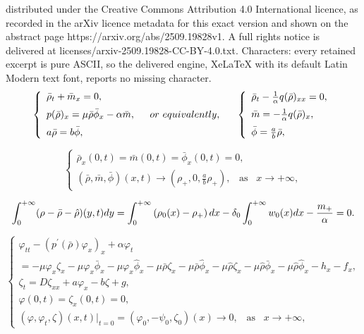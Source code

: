 \documentclass[10pt,a4paper]{amsart}
\begin{document}
distributed under the Creative Commons Attribution 4.0 International licence, as recorded in the arXiv licence metadata for this exact version and shown on the abstract page https://arxiv.org/abs/2509.19828v1. A full rights notice is delivered at licenses/arxiv-2509.19828-CC-BY-4.0.txt. Characters: every retained excerpt is pure ASCII, so the delivered engine, XeLaTeX with its default Latin Modern text font, reports no missing character.
	\begin{equation}\label{6}
		\left\{
		\begin{array}{lr}
			\bar\rho_t+\bar m_x=0,      \\[2mm]
			p(\bar\rho)_x=\mu\bar\rho\bar\phi_x-\alpha\bar m, \\[2mm]
			a\bar\rho=b\bar\phi,\\
		\end{array}
		\right.\;\;\;{\rm or \ equivalently,}\;\;\;\;\;\;
		\left\{
		\begin{array}{lr}
			\bar\rho_t-\frac{1}{\alpha}q(\bar\rho)_{xx}=0,     \\[2mm]
			\bar m=-\frac{1}{\alpha}q(\bar\rho)_x, \\[2mm]
			\bar\phi=\frac{a}{b}\bar\rho, \\
		\end{array}
		\right.
	\end{equation}

	\begin{equation}\label{7}
	\left\{
		\begin{array}{lr}
		\bar\rho_x(0,t)=\bar m(0,t)=\bar\phi_x(0,t)=0,\\[2mm]
		(\bar\rho,\bar m,\bar\phi)(x,t)\to\left(\rho_{+},0,\frac{a}{b}\rho_{+}\right),\;\;\;\mbox{as}\;\;\;x\to+\infty,
		\end{array}
		\right.
	\end{equation}

\begin{equation}\label{15}
\int_{0}^{+\infty}(\rho-\bar{\rho}-\hat{\rho})(y, t) {\rm d}y=\int_{0}^{+\infty}\left(\rho_{0}(x)-\rho_{+}\right) {\rm d} x-\delta_{0} \int_{0}^{+\infty} w_{0}(x) {\rm d} x-\frac{m_{+}}{\alpha}=0.
\end{equation}

	\begin{equation}\label{20}
		\left\{
		\begin{array}{lr}
			\varphi_{tt}-\left(p^{\prime}(\bar\rho)\varphi_x\right)_x	+\alpha \varphi_t\\[2mm]
			=-\mu \varphi_x\zeta_x-\mu \varphi_x\bar\phi_x-\mu \varphi_x\hat\phi_x-\mu\bar\rho\zeta_x-\mu\bar\rho\hat\phi_x-\mu\hat\rho\zeta_x-\mu\hat\rho\bar\phi_x-\mu\hat\rho\hat\phi_x-h_x-f_x,\\[2mm]
			\zeta_t=D\zeta_{xx}+a\varphi_x-b\zeta+g,\\[2mm]
			\varphi(0,t)=\zeta_x(0,t)=0,\\[2mm]
			\left(\varphi,\varphi_t,\zeta\right)(x,t)|_{t=0}=(\varphi_0,-\psi_0,\zeta_0)(x)\to0,\;\;\;\mbox{as}\;\;\; x\to+\infty,
		\end{array}
		\right.
	\end{equation}
\end{document}
